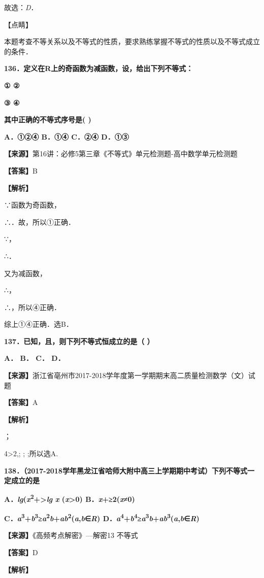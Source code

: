 \documentclass[
]{article}
\begin{document}
故选：\emph{D}．

【点睛】

本题考查不等关系以及不等式的性质，要求熟练掌握不等式的性质以及不等式成立的条件．

\textbf{136．定义在R上的奇函数为减函数，设，给出下列不等式：}

\textbf{① ②}

\textbf{③ ④}

\textbf{其中正确的不等式序号是( )}

\textbf{A．①②④ B．①④ C．②④ D．①③}

\textbf{【来源】}第16讲：必修5第三章《不等式》单元检测题-高中数学单元检测题

\textbf{【答案】}B

\textbf{【解析】}

∵函数为奇函数，

∴．故，所以①正确．

∵，

∴．

又为减函数，

∴，

∴，所以④正确．

综上①④正确．选B．

\textbf{137．已知，且，则下列不等式恒成立的是（ ）}

\textbf{A． B． C． D．}

\textbf{【来源】}浙江省亳州市2017-2018学年度第一学期期末高二质量检测数学（文）试题

\textbf{【答案】}A

\textbf{【解析】}

；

4\textgreater2,; ; ;所以选A.

\textbf{138．（2017-2018学年黑龙江省哈师大附中高三上学期期中考试）下列不等式一定成立的是}

\textbf{A．\emph{lg}(\emph{x}\textsuperscript{2}+\textgreater{}\emph{lg}
\emph{x} (\emph{x}\textgreater0) B．\emph{x}+≥2(\emph{x}≠0)}

\textbf{C．\emph{a}\textsuperscript{3}+\emph{b}\textsuperscript{3}≥\emph{a}\textsuperscript{2}\emph{b}+\emph{ab}\textsuperscript{2}(\emph{a},\emph{b}∈\emph{R})
D．\emph{a}\textsuperscript{4}+\emph{b}\textsuperscript{4}≥\emph{a}\textsuperscript{3}\emph{b}+\emph{ab}\textsuperscript{3}(\emph{a},\emph{b}∈\emph{R})}

\textbf{【来源】}《高频考点解密》---解密13 不等式

\textbf{【答案】}D

\textbf{【解析】}
\end{document}
